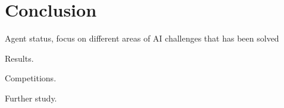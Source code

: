 \chapter{Conclusion}
Agent status, focus on different areas of AI challenges that has been solved

Results.

Competitions.

Further study.